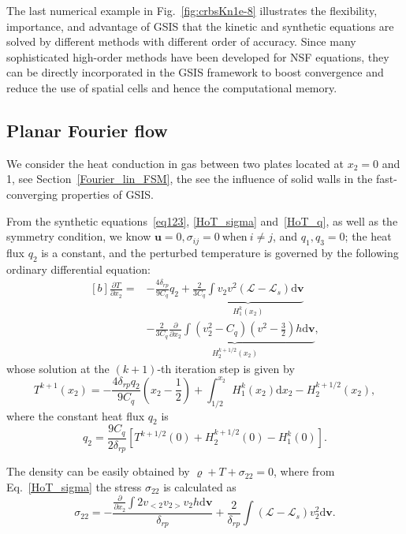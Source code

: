 The last numerical example in Fig.~\ref{fig:crbsKn1e-8} illustrates the flexibility, importance, and advantage of GSIS that the kinetic and synthetic equations are solved by different methods with different order of accuracy. Since many sophisticated high-order methods have been developed for NSF equations, they can be directly incorporated in the GSIS framework to boost convergence and reduce the use of spatial cells and hence the computational memory.  


\subsection{Planar Fourier flow}

We consider the heat conduction in gas between two plates located at $x_2=0$ and 1, see  Section~\ref{Fourier_lin_FSM}, the see the influence of solid walls in the fast-converging properties of GSIS. 

From the synthetic equations~\eqref{eq123}, \eqref{HoT_sigma} and~\eqref{HoT_q}, as well as the symmetry condition, we know $\bm{u}=0, \sigma_{ij}=0~ \text{when}~ i\neq{j}$, and $q_1, q_3=0$; the heat flux $q_2$ is a constant, and the perturbed temperature is governed by the following ordinary differential equation:
\begin{equation}\label{HoT_q_Fourier}
\begin{aligned}[b]
\frac{\partial T}{\partial x_2}=&-\frac{4\delta_{rp}}{9C_q}q_{2}+\underbrace{\frac{2}{3C_q}\int{}v_2v^2(\mathcal{L}-\mathcal{L}_{s})\mathrm{d}\bm{v}}_{H_1^{k}(x_2)}\\
&-\underbrace{\frac{2}{3C_q}\frac{\partial }{\partial x_2}\int{}(v_2^2-C_q)\left(v^2-\frac{3}{2}\right)h\mathrm{d}\bm{v}}_{H_2^{k+1/2}(x_2)},
\end{aligned}
\end{equation}
whose solution at the $(k+1)$-th iteration step is given by 
\begin{equation}
T^{k+1}(x_2)=-\frac{4\delta_{rp}{q}_2}{9C_q}\left(x_2-\frac{1}{2}\right)+\int_{1/2}^{x_2}H_1^{k}(x_2)\mathrm{d}x_2-H_2^{k+1/2}(x_2),
\end{equation}
where the constant heat flux $q_2$ is
\begin{equation}
q_2=\frac{9C_q}{2\delta_{rp}}\left[
T^{k+1/2}(0)+H_2^{k+1/2}(0)-H_1^{k}(0) \right].
\end{equation}


The density can be easily obtained by $\varrho+T+\sigma_{22}=0$, where from Eq.~\eqref{HoT_sigma} the stress $\sigma_{22}$ is calculated as
\begin{equation}\label{HoT_sigma_Fourier}
\sigma_{22} 
=-\frac{\frac{\partial}{\partial x_2}\int{}2v_{<2}v_{2>}v_2h\mathrm{d}\bm{v}}{\delta_{rp}}+\frac{2}{\delta_{rp}}\int{(\mathcal{L}-\mathcal{L}_s)v_2^2}\mathrm{d}\bm{v}.
\end{equation}


